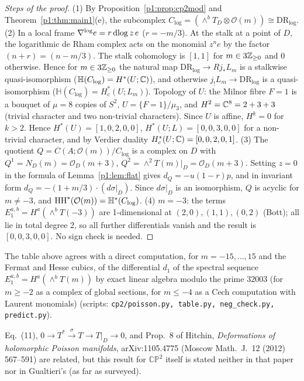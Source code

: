 \begin{proof}[Steps of the proof]
(1) By Proposition~\ref{p1:prop:cp2mod} and Theorem~\ref{p1:thm:main1}(e), the subcomplex $C_{\log}=(\wedge^bT_D\otimes\mathcal O(m))\cong\mathrm{DR}_{\log}$.
(2) In a local frame $\nabla^{\log}e=r\,\mathrm{dlog}\, z\,e$ ($r=-m/3$). At the stalk at a point of $D$, the logarithmic de Rham complex acts on the monomial $z^ne$ by the factor $(n+r)=(n-m/3)$. The stalk cohomology is $[1,1]$ for $m\in3\mathbb Z_{\ge0}$ and $0$ otherwise. Hence for $m\in3\mathbb Z_{\ge0}$ the natural map $\mathrm{DR}_{\log}\to Rj_*L_m$ is a stalkwise quasi-isomorphism ($\mathbb H(C_{\log})=H^*(U;\mathbb C)$), and otherwise $j_!L_m\to\mathrm{DR}_{\log}$ is a quasi-isomorphism ($\mathbb H(C_{\log})=H_c^*(U;L_m)$). Topology of $U$: the Milnor fibre $F=1$ is a bouquet of $\mu=8$ copies of $S^2$, $U=\{F=1\}/\mu_3$, and $H^2=\mathbb C^8=2+3+3$ (trivial character and two non-trivial characters). Since $U$ is affine, $H^k=0$ for $k>2$. Hence $H^*(U)=[1,0,2,0,0]$, $H^*(U;L)=[0,0,3,0,0]$ for a non-trivial character, and by Verdier duality $H^*_c(U;\mathbb C)=[0,0,2,0,1]$.
(3) The quotient $Q=C(A;\mathcal O(m))/C_{\log}$ is a complex on $D$ with $Q^1=N_D(m)=\mathcal O_D(m+3)$, $Q^2=\wedge^2T(m)|_D=\mathcal O_D(m+3)$. Setting $z=0$ in the formula of Lemma~\ref{p1:lem:flat} gives $d_Q=-u(1-r)p$, and in invariant form $d_Q=-(1+m/3)\cdot(d\sigma|_D)$. Since $d\sigma|_D$ is an isomorphism, $Q$ is acyclic for $m\ne-3$, and $\mathrm{HH}^*(\mathcal O(m))=\mathbb H^*(C_{\log})$.
(4) $m=-3$: the terms $E_1^{a,b}=H^a(\wedge^bT(-3))$ are 1-dimensional at $(2,0),(1,1),(0,2)$ (Bott); all lie in total degree 2, so all further differentials vanish and the result is $[0,0,3,0,0]$. No sign check is needed.
\end{proof}
\begin{rem}[\tV]
The table above agrees with a direct computation, for $m=-15,\dots,15$ and the Fermat and Hesse cubics, of the differential $d_1$ of the spectral sequence $E_1^{a,b}=H^a(\wedge^bT(m))$ by exact linear algebra modulo the prime $32003$ (for $m\ge-2$ as a complex of global sections, for $m\le-4$ as a Cech computation with Laurent monomials) (scripts: \texttt{cp2/poisson.py, table.py, neg\_check.py, predict.py}).
\end{rem}
\begin{rem}
Eq.~(11), $0\to T^*\xrightarrow{\sigma}T\to T|_D\to0$, and Prop.~8 of Hitchin, \emph{Deformations of holomorphic Poisson manifolds}, arXiv:1105.4775 (Moscow Math.\ J.\ 12 (2012) 567--591) are related, but this result for $\mathbb{CP}^2$ itself is stated neither in that paper nor in Gualtieri's (as far as surveyed).
\end{rem}

